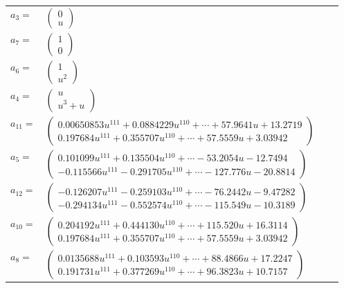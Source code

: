 \documentclass[1p]{elsarticle_modified}
\theoremstyle{definition}
\begin{document}
\begin{tabular}{m{7pt} m{180pt} m{7pt} m{180pt} }
\flushright $a_{3}=$&$\begin{pmatrix}0\\u\end{pmatrix}$ \\
\flushright $a_{7}=$&$\begin{pmatrix}1\\0\end{pmatrix}$ \\
\flushright $a_{6}=$&$\begin{pmatrix}1\\u^2\end{pmatrix}$ \\
\flushright $a_{4}=$&$\begin{pmatrix}u\\u^3+u\end{pmatrix}$ \\
\flushright $a_{11}=$&$\begin{pmatrix}0.00650853 u^{111}+0.0884229 u^{110}+\cdots+57.9641 u+13.2719\\0.197684 u^{111}+0.355707 u^{110}+\cdots+57.5559 u+3.03942\end{pmatrix}$ \\
\flushright $a_{5}=$&$\begin{pmatrix}0.101099 u^{111}+0.135504 u^{110}+\cdots-53.2054 u-12.7494\\-0.115566 u^{111}-0.291705 u^{110}+\cdots-127.776 u-20.8814\end{pmatrix}$ \\
\flushright $a_{12}=$&$\begin{pmatrix}-0.126207 u^{111}-0.259103 u^{110}+\cdots-76.2442 u-9.47282\\-0.294134 u^{111}-0.552574 u^{110}+\cdots-115.549 u-10.3189\end{pmatrix}$ \\
\flushright $a_{10}=$&$\begin{pmatrix}0.204192 u^{111}+0.444130 u^{110}+\cdots+115.520 u+16.3114\\0.197684 u^{111}+0.355707 u^{110}+\cdots+57.5559 u+3.03942\end{pmatrix}$ \\
\flushright $a_{8}=$&$\begin{pmatrix}0.0135688 u^{111}+0.103593 u^{110}+\cdots+88.4866 u+17.2247\\0.191731 u^{111}+0.377269 u^{110}+\cdots+96.3823 u+10.7157\end{pmatrix}$ \\

\end{tabular}
\end{document}
